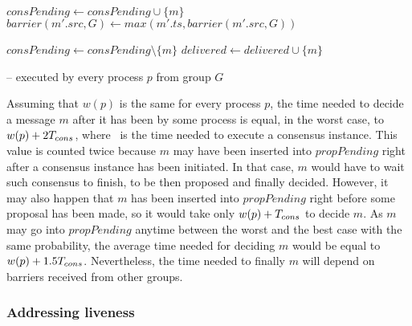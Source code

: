 \documentclass[times, 10pt]{article}
\begin{document}
\begin{algorithm}
\begin{distribalgo}[1]
\blankline
{}
    \STATE $consPending \leftarrow consPending \cup \{m\}$
  \ENDIF
  \STATE $barrier(m'.src,G) \leftarrow max(m'.ts, barrier(m'.src,G))$ \label{algline:incbar} 
\ENDINDENT

\blankline
{}
  \STATE $consPending \leftarrow consPending \setminus \{m\}$
  \STATE {}
  \STATE $delivered \leftarrow delivered \cup \{m\}$

\blankline
\ENDINDENT

\caption{ -- executed by every process $p$ from group $G$}
\label{algorithm:quasi}
\end{distribalgo}
\end{algorithm}

Assuming that $w(p)$ is the same for every process $p$, the time needed to decide a message $m$ after it has been \cms{} by some process is equal, in the worst case, to $w(p) + 2T_{cons}$, where \tcons\ is the time needed to execute a consensus instance. This value is counted twice because $m$ may have been inserted into $propPending$ right after a consensus instance has been initiated. In that case, $m$ would have to wait such consensus to finish, to be then proposed and finally decided. However, it may also happen that $m$ has been inserted into $propPending$ right before some proposal has been made, so it would take only $w(p) + T_{cons}$ to decide $m$. As $m$ may go into $propPending$ anytime between the worst and the best case with the same probability, the average time needed for deciding $m$ would be equal to $w(p) + 1.5T_{cons}$. Nevertheless, the time needed to finally \cons{} $m$ will depend on barriers received from other groups.

\subsubsection{Addressing liveness}
\end{document}

